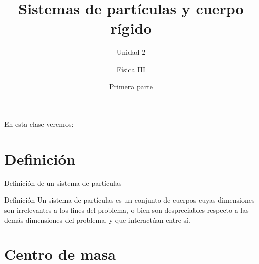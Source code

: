 \documentclass[11pt,handout,aspectratio=1610]{beamer}
\title{Sistemas de partículas y cuerpo rígido}
\subtitle{Unidad 2}
\author{Física III}
\institute{Instituto de Tecnología e Ingeniería \\ \vspace{0.25cm} Universidad Nacional de Hurlingham}
\date{Primera parte}
\begin{document}
\frame{\titlepage}

\begin{frame}{En esta clase veremos:}
    \tableofcontents
\end{frame}

\section{Definición}

\begin{frame}{Definición de un sistema de partículas}

    \begin{block}{Definición}
        Un sistema de partículas es un conjunto de cuerpos cuyas dimensiones son irrelevantes a los fines del problema, o bien son despreciables respecto a las demás dimensiones del problema, y que interactúan entre sí.
    \end{block}

\end{frame}

\section{Centro de masa}


    
\end{document}
